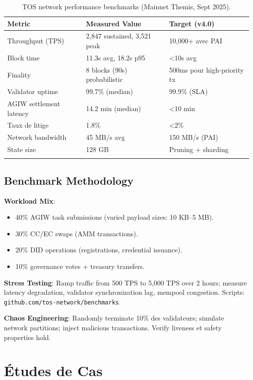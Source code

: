 \documentclass[11pt]{article}
\begin{document}
\begin{longtable}{@{}p{}p{}p{}@{}}
\toprule
\textbf{Metric} & \textbf{Measured Value} & \textbf{Target (v4.0)} \\\midrule
Throughput (TPS) & 2,847 sustained, 3,521 peak & 10,000+ avec PAI \\
Block time & 11.3s avg, 18.2s p95 & <10s avg \\
Finality & 8 blocks (90s) probabilistic & 500ms pour high-priority tx \\
Validator uptime & 99.7\% (median) & 99.9\% (SLA) \\
AGIW settlement latency & 14.2 min (median) & <10 min \\
Taux de litige & 1.8\% & <2\% \\
Network bandwidth & 45 MB/s avg & 150 MB/s (PAI) \\
State size & 128 GB & Pruning + sharding \\
\bottomrule
\caption{TOS network performance benchmarks (Mainnet Themis, Sept 2025).}
\end{longtable}

\subsection{Benchmark Methodology}

\textbf{Workload Mix}:
\begin{itemize}[noitemsep]
  \item 40\% AGIW task submissions (varied payload sizes: 10 KB--5 MB).
  \item 30\% CC/EC swaps (AMM transactions).
  \item 20\% DID operations (registrations, credential issuance).
  \item 10\% governance votes + treasury transfers.
\end{itemize}

\textbf{Stress Testing}: Ramp traffic from 500 TPS to 5,000 TPS over 2 hours; measure latency degradation, validator synchronization lag, mempool congestion. Scripts: \texttt{github.com/tos-network/benchmarks}.

\textbf{Chaos Engineering}: Randomly terminate 10\% des validateurs; simulate network partitions; inject malicious transactions. Verify liveness et safety properties hold.

\section{Études de Cas}
\label{sec:case-studies}
\end{document}

